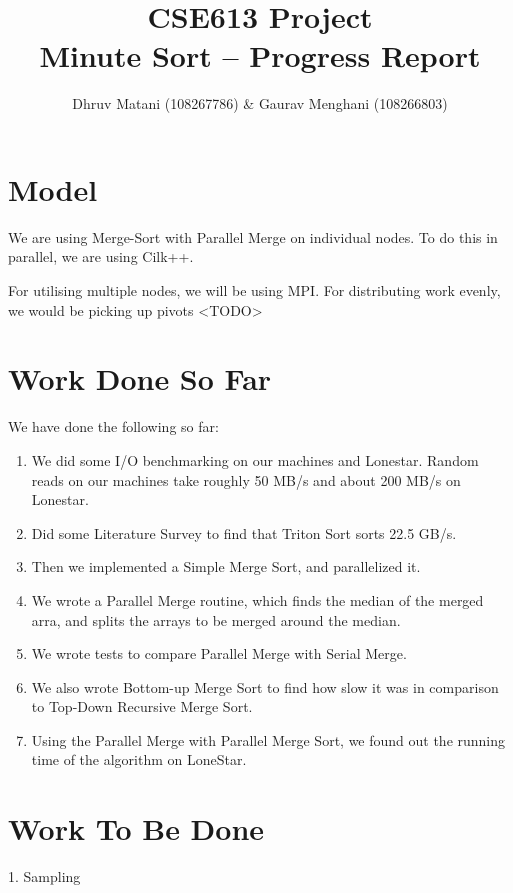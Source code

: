 \documentclass{article}
\title{CSE613 Project\\Minute Sort -- Progress Report}
\author{Dhruv Matani (108267786) \& Gaurav Menghani (108266803)}
\begin{document}
\maketitle

\clearpage

\section{Model}
We are using Merge-Sort with Parallel Merge on individual nodes. To do this in parallel, we are using Cilk++. 

For utilising multiple nodes, we will be using MPI. For distributing work evenly, we would be picking up pivots <TODO>

\section{Work Done So Far}
We have done the following so far:
\begin{enumerate}
\item We did some I/O benchmarking on our machines and Lonestar. Random reads on our machines take roughly 50 MB/s and about 200 MB/s on Lonestar. 
\item Did some Literature Survey to find that Triton Sort sorts 22.5 GB/s.
\item Then we implemented a Simple Merge Sort, and parallelized it.
\item We wrote a Parallel Merge routine, which finds the median of the merged arra, and splits the arrays to be merged around the median. 
\item We wrote tests to compare Parallel Merge with Serial Merge.
\item We also wrote Bottom-up Merge Sort to find how slow it was in comparison to Top-Down Recursive Merge Sort.
\item Using the Parallel Merge with Parallel Merge Sort, we found out the running time of the algorithm on LoneStar.
\end{enumerate}
\section{Work To Be Done}
1. Sampling 
\end{document}

